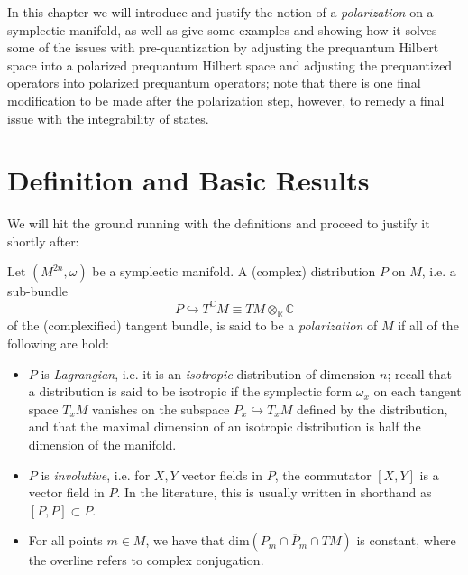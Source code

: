 In this chapter we will introduce and justify the notion of a \emph{polarization} on a symplectic manifold, as well as give some examples and showing how it solves some of the issues with pre-quantization by adjusting the prequantum Hilbert space into a polarized prequantum Hilbert space and adjusting the prequantized operators into polarized prequantum operators; note that there is one final modification to be made after the polarization step, however, to remedy a final issue with the integrability of states.

\section{Definition and Basic Results}

We will hit the ground running with the definitions and proceed to justify it shortly after:

\begin{defn}
Let $(M^{2n},\omega)$ be a symplectic manifold. A (complex) distribution $P$ on $M$, i.e. a sub-bundle
$$
P \hookrightarrow T^{\mathbb{C}}M \equiv TM \otimes_\mathbb{R} \mathbb{C}
$$
of the (complexified) tangent bundle, is said to be a \emph{polarization} of $M$ if all of the following are hold:
\begin{itemize}
\item $P$ is \emph{Lagrangian}, i.e. it is an \emph{isotropic} distribution of dimension $n$; recall that a distribution is said to be isotropic if the symplectic form $\omega_x$ on each tangent space $T_xM$ vanishes on the subspace $P_x \hookrightarrow T_xM$ defined by the distribution, and that the maximal dimension of an isotropic distribution is half the dimension of the manifold.

\item $P$ is \emph{involutive}, i.e. for $X,Y$ vector fields in $P$, the commutator $[X,Y]$ is a vector field in $P$. In the literature, this is usually written in shorthand as $[P,P] \subset P$.

\item For all points $m \in M$, we have that $\mathrm{dim}(P_m \cap \overline{P}_m \cap TM)$ is constant, where the overline refers to complex conjugation.

\end{itemize}
\end{defn}

